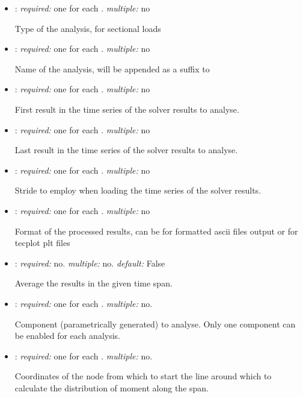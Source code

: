 \begin{itemize}
\item {}: \textit{required:} one for each . \textit{multiple:} no

Type of the analysis,  for sectional loads

\item {}: \textit{required:} one for each . \textit{multiple:} no

Name of the analysis, will be appended as a suffix to 

\item {}: \textit{required:} one for each . \textit{multiple:} no

First result in the time series of the solver results to analyse.

\item {}: \textit{required:} one for each . \textit{multiple:} no

Last result in the time series of the solver results to analyse.

\item {}: \textit{required:} one for each . \textit{multiple:} no

Stride to employ when loading the time series of the solver results. 

\item {}: \textit{required:} one for each . \textit{multiple:} no

Format of the processed results, can be  for formatted ascii files output or  for tecplot plt files

\item {}: \textit{required:} no. \textit{multiple:} no. \textit{default:} False

Average the results in the given time span.

\item {}: \textit{required:} one for each . \textit{multiple:} no.

Component (parametrically generated) to analyse. Only one component can be enabled for each analysis. 

\item {}: \textit{required:} one for each . \textit{multiple:} no.

Coordinates of the node from which to start the line around which to calculate the distribution of moment along the span.


\end{itemize}
